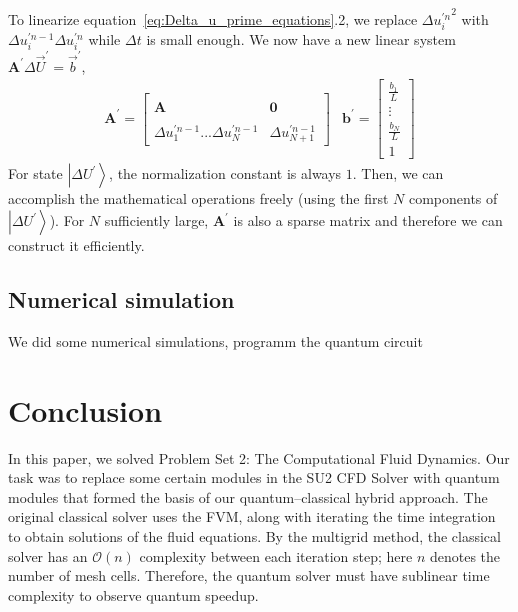 \documentclass[%
 reprint,
 amsmath,amssymb,
pra,
]{revtex4-1}
\begin{document}
To linearize equation~\ref{eq:Delta_u_prime_equations}.2, we replace ${\Delta u^{\prime n}_i}^2$ with $\Delta u^{\prime n - 1}_i \Delta u^{\prime n}_i$ while $\Delta t$ is small enough. We now have a new linear system $\bm{A^{\prime}} \Delta \vec{U}^{\prime} = \vec{b}^{\prime}$,
\begin{equation}
\begin{array}{cc}
\bm{A^{\prime}} = \left[
\begin{array}{cc}
  &\\
  \bm{A} & \bm{0}\\
  &\\
  \Delta u^{\prime n - 1}_1...\Delta u^{\prime n - 1}_N&\Delta u^{\prime n - 1}_{N+1}
\end{array}
\right]
&
\bm{b^{\prime}} = \left[
\begin{array}{c}
  \frac{b_1}{L}\\
  \vdots\\
  \frac{b_N}{L}\\
  1
\end{array}
\right]
\end{array}
\end{equation}
For state $\left|\Delta U^{\prime}\right\rangle$, the normalization constant is always $1$. Then, we can accomplish the mathematical operations freely (using the first $N$ components of $\left|\Delta U^{\prime}\right\rangle$). For $N$ sufficiently large, $\bm{A^{\prime}}$ is also a sparse matrix and therefore we can construct it efficiently.



\subsection{Numerical simulation}

We did some numerical simulations, 
programm the quantum circuit



\section{Conclusion}

In this paper, we solved Problem Set 2: The Computational Fluid Dynamics. Our task was to replace some certain modules in the SU2 CFD Solver with quantum modules that formed the basis of our quantum--classical hybrid approach. The original classical solver uses the FVM, along with iterating the time integration to obtain solutions of the fluid equations. By the multigrid method, the classical solver has an $\mathcal{O}(n)$ complexity between each iteration step; here $n$ denotes the number of mesh cells. Therefore, the quantum solver must have sublinear time complexity to observe quantum speedup.
\end{document}
